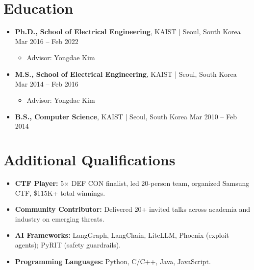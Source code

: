 \documentclass[11pt,letterpaper]{article}
\newcommand{\jobtitle}[1]{\textbf{#1}}
\newcommand{\location}[1]{\textcolor{secondary}{\small #1}}
\newcommand{\daterange}[1]{\textcolor{secondary}{\small #1}}
\begin{document}
\section{Education}
\begin{itemize}[]
\item \jobtitle{Ph.D., School of Electrical Engineering}, \location{KAIST | Seoul, South Korea} \hfill \daterange{Mar 2016 -- Feb 2022}
    \begin{itemize}[] %
    \item Advisor: Yongdae Kim
    \end{itemize}
\item \jobtitle{M.S., School of Electrical Engineering}, \location{KAIST | Seoul, South Korea} \hfill \daterange{Mar 2014 -- Feb 2016}
    \begin{itemize}[] %
    \item Advisor: Yongdae Kim
    \end{itemize}
\item \jobtitle{B.S., Computer Science}, \location{KAIST | Seoul, South Korea} \hfill \daterange{Mar 2010 -- Feb 2014}
\end{itemize}

\section{Additional Qualifications}
\begin{itemize}[itemsep=3pt]

\item \textbf{CTF Player:}
    5× DEF CON finalist, led 20-person team, organized Samsung CTF, \$115K+ total winnings.
\item \textbf{Community Contributor:}
    Delivered 20+ invited talks across academia and industry on emerging threats.
\item \textbf{AI Frameworks:} LangGraph, LangChain, LiteLLM, Phoenix (exploit agents); PyRIT (safety guardrails).
\item \textbf{Programming Languages:} Python, C/C++, Java, JavaScript.
\end{itemize}
\end{document}

